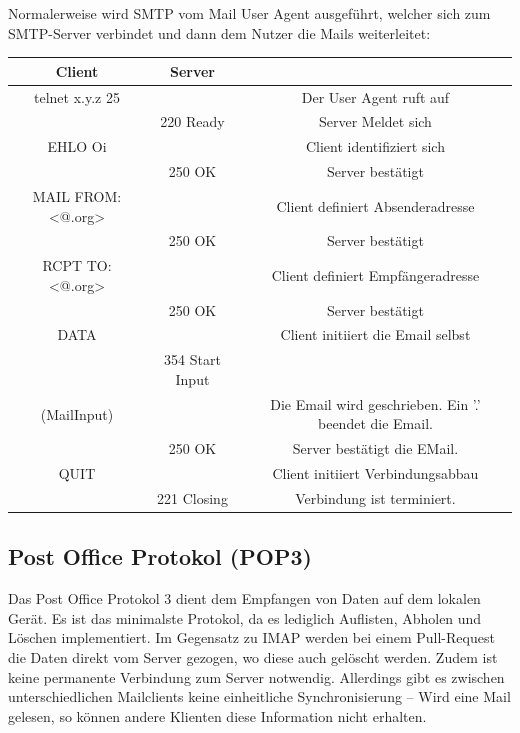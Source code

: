 \documentclass{scrartcl}
\begin{document}
    Normalerweise wird SMTP vom Mail User Agent ausgeführt, welcher sich zum SMTP-Server verbindet und dann dem Nutzer die Mails weiterleitet:
    
    \begin{center}
        \begin{tabular}{c|c|c}
            Client              &   Server          &                                   \\\hline
            telnet x.y.z 25     &                   & Der User Agent ruft auf           \\
                                &   220 Ready       & Server Meldet sich                \\
            EHLO Oi             &                   & Client identifiziert sich         \\
                                &   250 OK          & Server bestätigt                  \\
            MAIL FROM: <@.org>  &                   & Client definiert Absenderadresse  \\
                                &   250 OK          & Server bestätigt                  \\
            RCPT TO: <@.org>    &                   & Client definiert Empfängeradresse \\  
                                &   250 OK          & Server bestätigt                  \\
            DATA                &                   & Client initiiert die Email selbst \\
                            &   354 Start Input &                                   \\
            (MailInput)         &                   & Die Email wird geschrieben. Ein '.' beendet die Email.  \\
                                &   250 OK          & Server bestätigt die EMail.       \\ 
            QUIT                &                   & Client initiiert Verbindungsabbau \\
                                &   221 Closing     & Verbindung ist terminiert.    \\
        \end{tabular}
    \end{center}
    
    \subsection{Post Office Protokol (POP3)}
    \label{protocols:pop3}
    Das Post Office Protokol 3 dient dem Empfangen von Daten auf dem lokalen Gerät.
    Es ist das minimalste Protokol, da es lediglich Auflisten, Abholen und Löschen implementiert. 
    Im Gegensatz zu IMAP werden bei einem Pull-Request die Daten direkt vom Server gezogen, 
    wo diese auch gelöscht werden. Zudem ist keine permanente Verbindung zum Server notwendig. 
    Allerdings gibt es zwischen unterschiedlichen Mailclients keine einheitliche Synchronisierung -- Wird eine Mail gelesen, so können andere Klienten diese Information nicht erhalten.
\end{document}
